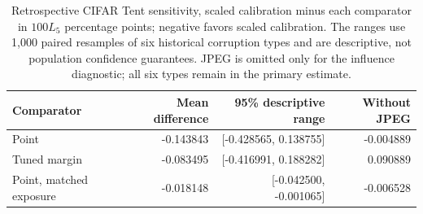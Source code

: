 \begin{table}[tb]
\centering\small
\caption{Retrospective CIFAR Tent sensitivity, scaled calibration minus each comparator in $100L_5$ percentage points; negative favors scaled calibration. The ranges use 1,000 paired resamples of six historical corruption types and are descriptive, not population confidence guarantees. JPEG is omitted only for the influence diagnostic; all six types remain in the primary estimate.}
\label{tab:journal-tent-sensitivity}
\begin{tabular}{lrrr}
\toprule
Comparator & Mean difference & 95\% descriptive range & Without JPEG \\
\midrule
Point & -0.143843 & [-0.428565, 0.138755] & -0.004889 \\
Tuned margin & -0.083495 & [-0.416991, 0.188282] & 0.090889 \\
Point, matched exposure & -0.018148 & [-0.042500, -0.001065] & -0.006528 \\
\bottomrule
\end{tabular}
\end{table}
